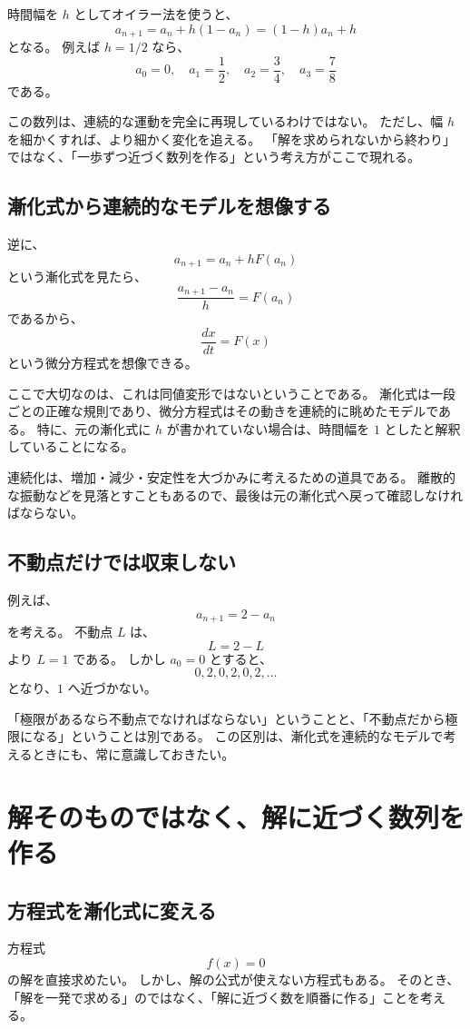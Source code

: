 時間幅を $h$ としてオイラー法を使うと、
\[
  a_{n+1}=a_n+h(1-a_n)=(1-h)a_n+h
\]
となる。
例えば $h=1/2$ なら、
\[
  a_0=0,\quad a_1=\frac12,\quad
  a_2=\frac34,\quad a_3=\frac78
\]
である。

この数列は、連続的な運動を完全に再現しているわけではない。
ただし、幅 $h$ を細かくすれば、より細かく変化を追える。
「解を求められないから終わり」ではなく、「一歩ずつ近づく数列を作る」という考え方がここで現れる。

\subsection{漸化式から連続的なモデルを想像する}

逆に、
\[
  a_{n+1}=a_n+hF(a_n)
\]
という漸化式を見たら、
\[
  \frac{a_{n+1}-a_n}{h}=F(a_n)
\]
であるから、
\[
  \frac{dx}{dt}=F(x)
\]
という微分方程式を想像できる。

ここで大切なのは、これは同値変形ではないということである。
漸化式は一段ごとの正確な規則であり、微分方程式はその動きを連続的に眺めたモデルである。
特に、元の漸化式に $h$ が書かれていない場合は、時間幅を $1$ としたと解釈していることになる。

連続化は、増加・減少・安定性を大づかみに考えるための道具である。
離散的な振動などを見落とすこともあるので、最後は元の漸化式へ戻って確認しなければならない。

\subsection{不動点だけでは収束しない}

例えば、
\[
  a_{n+1}=2-a_n
\]
を考える。
不動点 $L$ は、
\[
  L=2-L
\]
より $L=1$ である。
しかし $a_0=0$ とすると、
\[
  0,2,0,2,0,2,\ldots
\]
となり、$1$ へ近づかない。

「極限があるなら不動点でなければならない」ということと、「不動点だから極限になる」ということは別である。
この区別は、漸化式を連続的なモデルで考えるときにも、常に意識しておきたい。

\section{解そのものではなく、解に近づく数列を作る}

\subsection{方程式を漸化式に変える}

方程式
\[
  f(x)=0
\]
の解を直接求めたい。
しかし、解の公式が使えない方程式もある。
そのとき、「解を一発で求める」のではなく、「解に近づく数を順番に作る」ことを考える。

